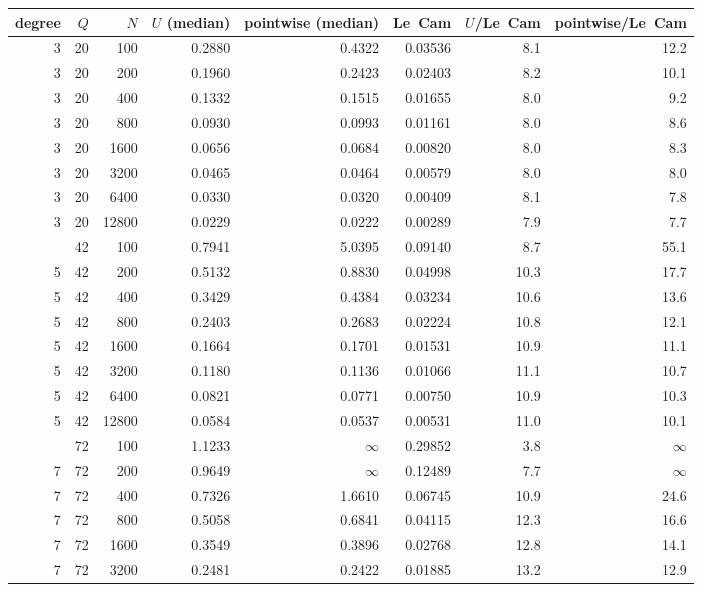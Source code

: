 \begin{table}[!htbp]
\centering\small
\begin{adjustbox}{max width=\textwidth, max totalheight=0.9\textheight}
\begin{tabular}{rrrrrrrr}
\toprule
degree & $Q$ & $N$ & $U$ (median) & pointwise (median) & Le~Cam & $U$/Le~Cam & pointwise/Le~Cam \\
\midrule
3 & 20 & 100 & 0.2880 & 0.4322 & 0.03536 & 8.1 & 12.2 \\
3 & 20 & 200 & 0.1960 & 0.2423 & 0.02403 & 8.2 & 10.1 \\
3 & 20 & 400 & 0.1332 & 0.1515 & 0.01655 & 8.0 & 9.2 \\
3 & 20 & 800 & 0.0930 & 0.0993 & 0.01161 & 8.0 & 8.6 \\
3 & 20 & 1600 & 0.0656 & 0.0684 & 0.00820 & 8.0 & 8.3 \\
3 & 20 & 3200 & 0.0465 & 0.0464 & 0.00579 & 8.0 & 8.0 \\
3 & 20 & 6400 & 0.0330 & 0.0320 & 0.00409 & 8.1 & 7.8 \\
3 & 20 & 12800 & 0.0229 & 0.0222 & 0.00289 & 7.9 & 7.7 \\
\addlinespace
5 & 42 & 100 & 0.7941 & 5.0395 & 0.09140 & 8.7 & 55.1 \\
5 & 42 & 200 & 0.5132 & 0.8830 & 0.04998 & 10.3 & 17.7 \\
5 & 42 & 400 & 0.3429 & 0.4384 & 0.03234 & 10.6 & 13.6 \\
5 & 42 & 800 & 0.2403 & 0.2683 & 0.02224 & 10.8 & 12.1 \\
5 & 42 & 1600 & 0.1664 & 0.1701 & 0.01531 & 10.9 & 11.1 \\
5 & 42 & 3200 & 0.1180 & 0.1136 & 0.01066 & 11.1 & 10.7 \\
5 & 42 & 6400 & 0.0821 & 0.0771 & 0.00750 & 10.9 & 10.3 \\
5 & 42 & 12800 & 0.0584 & 0.0537 & 0.00531 & 11.0 & 10.1 \\
\addlinespace
7 & 72 & 100 & 1.1233 & $\infty$ & 0.29852 & 3.8 & $\infty$ \\
7 & 72 & 200 & 0.9649 & $\infty$ & 0.12489 & 7.7 & $\infty$ \\
7 & 72 & 400 & 0.7326 & 1.6610 & 0.06745 & 10.9 & 24.6 \\
7 & 72 & 800 & 0.5058 & 0.6841 & 0.04115 & 12.3 & 16.6 \\
7 & 72 & 1600 & 0.3549 & 0.3896 & 0.02768 & 12.8 & 14.1 \\
7 & 72 & 3200 & 0.2481 & 0.2422 & 0.01885 & 13.2 & 12.9 \\

\end{tabular}
\end{adjustbox}
\end{table}
